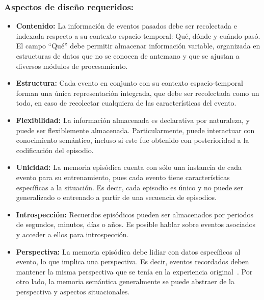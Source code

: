 \subsubsection{Aspectos de diseño requeridos:}


\begin{itemize}[topsep=0pt]
	\setlength\itemsep{0.2em}
	\item {} {\bfseries Contenido:}
	La información de eventos pasados debe ser recolectada e indexada respecto a su contexto espacio-temporal: Qué, dónde y cuándo pasó. El campo ``Qué'' debe permitir almacenar información variable, organizada en estructuras de datos que no se conocen de antemano y que se ajustan a diversos módulos de procesamiento. 
	
	\item {} {\bfseries Estructura:}
	Cada evento en conjunto con su contexto espacio-temporal forman una única representación integrada, que debe ser recolectada como un todo, en caso de recolectar cualquiera de las características del evento.
	
	\item {} {\bfseries Flexibilidad:}
	La información almacenada es declarativa por naturaleza, y puede ser flexiblemente almacenada. Particularmente, puede interactuar con conocimiento semántico, incluso si este fue obtenido con posterioridad a la codificación del episodio.
	
	\item {} {\bfseries Unicidad:}
	La memoria episódica cuenta con sólo una instancia de cada evento para su entrenamiento, pues cada evento tiene características específicas a la situación. Es decir, cada episodio es único y no puede ser generalizado o entrenado a partir de una secuencia de episodios.
	
	\item {} {\bfseries Introspección:}
	Recuerdos episódicos pueden ser almacenados por periodos de segundos, minutos, días o años. Es posible hablar sobre eventos asociados y acceder a ellos para introspección.
	
	\item {} {\bfseries Perspectiva:}
	La memoria episódica debe lidiar con datos específicos al evento, lo que implica una perspectiva. Es decir, eventos recordados deben mantener la misma perspectiva que se tenía en la experiencia original~\cite{CLAYTON20092330}. Por otro lado, la memoria semántica generalmente se puede abstraer de la perspectiva y aspectos situacionales.
	

\end{itemize}
